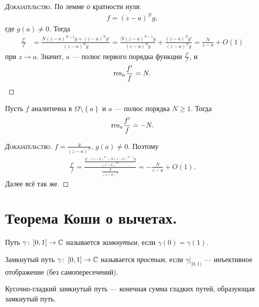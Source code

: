 \documentclass[../../main.tex]{subfiles}
\begin{document}
\begin{proof}[\normalfont\textsc{Доказательство}]
 По лемме о кратности нуля:
 \begin{align*}
  f=(z-a)^{N}g,
 \end{align*} где $ g(a) \neq 0 $. Тогда
 \begin{align*}
  \frac{f'}{f} &= \frac{N(z-a)^{N-1}g + (z-a)^{N}g'}{(z-a)^{N}g} = \frac{N (z-a)^{N - 1} g}{(z - a)^{N} g} + \frac{(z-a)^{N} g'}{(z-a)^{N} g}= \frac{N}{z-a} + O(1)
 \end{align*} при $ z \to a $. Значит, $ a $  --- полюс первого порядка функции $ \frac{f'}{f} $, и
 \begin{align*}
  \mathrm{res}_a \frac{f'}{f} = N.
 \end{align*}
\end{proof}

\begin{exmpl}
 \label{example:logarithmic_derivative2}
 Пусть $ f $ аналитична в $ \Omega \setminus \left\{ a \right\} $ и $ a $ --- полюс порядка $ N \geqslant 1$. Тогда
 \begin{align*}
  \mathrm{res}_a \frac{f'}{f} = -N.
 \end{align*}
\end{exmpl}
\begin{proof}[\normalfont\textsc{Доказательство}]
 $ f = \frac{g}{(z-a)^{N}} $, $ g(a) \neq 0 $. Поэтому
 \begin{align*}
  \frac{f'}{f} = \frac{ \frac{g' \cdot (z-a)^{N} - N(z-a)^{N-1}g}{(z-a)^{2N}} }{\frac{g}{(z-a)^{N}}} = -\frac{N}{z-a} + O(1).
 \end{align*} Далее всё так же.
\end{proof}

\newpage
\section{Теорема Коши о вычетах.}

\begin{df*}
 Путь $ \gamma \colon\,[0,1] \to \mathbb{C} $ называется \textit{замкнутым}, если $ \gamma(0) = \gamma(1) $.
\end{df*}

\begin{df*}
 Замкнутый путь $ \gamma\colon\,[0,1] \to \mathbb{C} $ называется \textit{простым}, если $\gamma |_{[0, 1)}$ --- инъективное отображение (без самопересечений).
\end{df*}

\begin{df*}
 Кусочно-гладкий замкнутый путь --- конечная сумма гладких путей, образующая замкнутый путь.
\end{df*}
\end{document}

